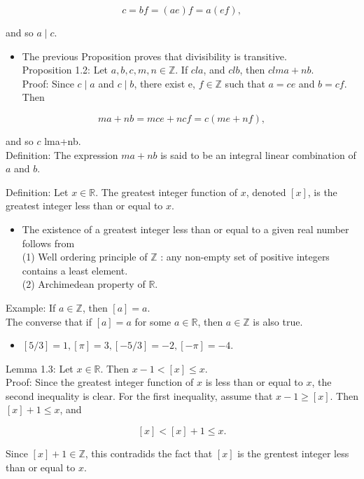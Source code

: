 \documentclass[10pt]{article}
\begin{document}
$$
c=b f=(a e) f=a(e f),
$$

and so $a \mid c$.

\begin{itemize}
  \item The previous Proposition proves that divisibility is transitive.\\
Proposition 1.2: Let $a, b, c, m, n \in \mathbb{Z}$. If $c l a$, and $c l b$, then $c l m a+n b$.\\
Proof: Since $c \mid a$ and $c \mid b$, there exist e, $f \in \mathbb{Z}$ such that $a=c e$ and $b=c f$. Then
\end{itemize}

$$
m a+n b=m c e+n c f=c(m e+n f),
$$

and so $c$ lma+nb.\\
Definition: The expression $m a+n b$ is said to be an integral linear combination of $a$ and $b$.

Definition: Let $x \in \mathbb{R}$. The greatest integer function of $x$, denoted $[x]$, is the greatest integer less than or equal to $x$.

\begin{itemize}
  \item The existence of a greatest integer less than or equal to a given real number follows from\\
(1) Well ordering principle of $\mathbb{Z}$ : any non-empty set of positive integers contains a least element.\\
(2) Archimedean property of $\mathbb{R}$.
\end{itemize}

Example: If $a \in \mathbb{Z}$, then $[a]=a$.\\
The converse that if $[a]=a$ for some $a \in \mathbb{R}$, then $a \in \mathbb{Z}$ is also true.

\begin{itemize}
  \item $[5 / 3]=1,[\pi]=3,[-5 / 3]=-2,[-\pi]=-4$.
\end{itemize}

Lemma 1.3: Let $x \in \mathbb{R}$. Then $x-1<[x] \leqslant x$.\\
Proof: Since the greatest integer function of $x$ is less than or equal to $x$, the second inequality is clear. For the first inequality, assume that $x-1 \geqslant[x]$. Then $[x]+1 \leqslant x$, and

$$
[x]<[x]+1 \leqslant x .
$$

Since $[x]+1 \in \mathbb{Z}$, this contradids the fact that $[x]$ is the grentest integer less than or equal to $x$.
\end{document}

